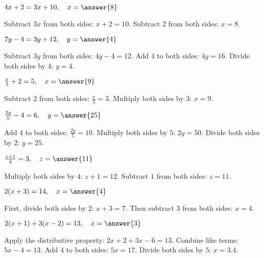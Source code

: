 \documentclass{ximera}
\begin{document}
\begin{problem}
$4x + 2 = 3x + 10,\quad x = \answer{8}$
\begin{feedback}
Subtract $3x$ from both sides: $x + 2 = 10$. Subtract $2$ from both sides: $x = 8$.
\end{feedback}
\end{problem}

\begin{problem}
$7y - 4 = 3y + 12,\quad y = \answer{4}$
\begin{feedback}
Subtract $3y$ from both sides: $4y - 4 = 12$. Add $4$ to both sides: $4y = 16$. Divide both sides by $4$: $y = 4$.
\end{feedback}
\end{problem}

\begin{problem}
$\frac{x}{3} + 2 = 5,\quad x = \answer{9}$
\begin{feedback}
Subtract $2$ from both sides: $\frac{x}{3} = 3$. Multiply both sides by $3$: $x = 9$.
\end{feedback}
\end{problem}

\begin{problem}
$\frac{2y}{5} - 4 = 6,\quad y = \answer{25}$
\begin{feedback}
Add $4$ to both sides: $\frac{2y}{5} = 10$. Multiply both sides by $5$: $2y = 50$. Divide both sides by $2$: $y = 25$.
\end{feedback}
\end{problem}

\begin{problem}
$\frac{z+1}{4} = 3,\quad z = \answer{11}$
\begin{feedback}
Multiply both sides by $4$: $z+1 = 12$. Subtract $1$ from both sides: $z = 11$.
\end{feedback}
\end{problem}

\begin{problem}
$2(x + 3) = 14,\quad x = \answer{4}$
\begin{feedback}
First, divide both sides by $2$: $x + 3 = 7$. Then subtract $3$ from both sides: $x = 4$.
\end{feedback}
\end{problem}

\begin{problem}
$2(x + 1) + 3(x - 2) = 13,\quad x = \answer{3}$
\begin{feedback}
Apply the distributive property: $2x + 2 + 3x - 6 = 13$. Combine like terms: $5x - 4 = 13$. Add $4$ to both sides: $5x = 17$. Divide both sides by $5$: $x = 3.4$.
\end{feedback}
\end{problem}
\end{document}

